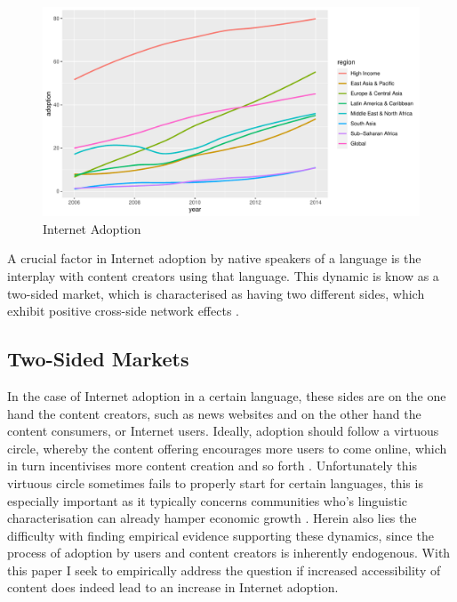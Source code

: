 \documentclass[a4paper,british]{article}\usepackage[]{graphicx}\usepackage[]{xcolor}
\makeatletter
\def\maxwidth{ %
  \ifdim\Gin@nat@width>\linewidth
    \linewidth
  \else
    \Gin@nat@width
  \fi
}
\newenvironment{knitrout}{}{} %
\makeatother
\begin{document}
\begin{figure}[h]
\caption{Internet Adoption}

\begin{centering}
\label{fig:adoption_growth}
\par\end{centering}
\begin{knitrout}
\color{fgcolor}
\includegraphics[width=\maxwidth]{../misc/latex-mobile_growth-1} 
\end{knitrout}
\end{figure}

A crucial factor in Internet adoption by native speakers of a language
is the interplay with content creators using that language. This dynamic
is know as a two-sided market, which is characterised as having two
different sides, which exhibit positive cross-side network effects
\citep{parker2000information,parker2000internetwork,parker2005two}.

\subsection{Two-Sided Markets}

In the case of Internet adoption in a certain language, these sides
are on the one hand the content creators, such as news websites and
on the other hand the content consumers, or Internet users. Ideally,
adoption should follow a virtuous circle, whereby the content offering
encourages more users to come online, which in turn incentivises more
content creation and so forth \citep{rochet2003platform,rochet2006two}.
Unfortunately this virtuous circle sometimes fails to properly start
for certain languages, this is especially important as it typically
concerns communities who's linguistic characterisation can already
hamper economic growth \citep{arcand2013language}. Herein also lies
the difficulty with finding empirical evidence supporting these dynamics,
since the process of adoption by users and content creators is inherently
endogenous. With this paper I seek to empirically address the question
if increased accessibility of content does indeed lead to an increase
in Internet adoption.
\end{document}
